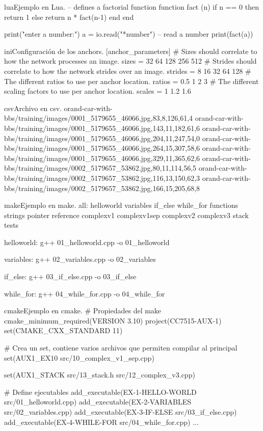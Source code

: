 \begin{sourcecode}{lua}{Ejemplo en Lua.}
-- defines a factorial function
function fact (n)
	if n == 0 then
		return 1
	else
		return n * fact(n-1)
	end
end

print("enter a number:")
a = io.read("*number")        -- read a number
print(fact(a))
\end{sourcecode}

\begin{sourcecode}{ini}{Configuración de los anchors.}
[anchor_parameters]
# Sizes should correlate to how the network processes an image.
sizes   = 32 64 128 256 512
# Strides should correlate to how the network strides over an image.
strides = 8 16 32 64 128
# The different ratios to use per anchor location.
ratios  = 0.5 1 2 3
# The different scaling factors to use per anchor location.
scales  = 1 1.2 1.6
\end{sourcecode}

\begin{sourcecode}{csv}{Archivo en csv.}
orand-car-with-bbs/training/images/0001_5179655_46066.jpg,83,8,126,61,4
orand-car-with-bbs/training/images/0001_5179655_46066.jpg,143,11,182,61,6
orand-car-with-bbs/training/images/0001_5179655_46066.jpg,204,11,247,54,0
orand-car-with-bbs/training/images/0001_5179655_46066.jpg,264,15,307,58,6
orand-car-with-bbs/training/images/0001_5179655_46066.jpg,329,11,365,62,6
orand-car-with-bbs/training/images/0002_5179657_53862.jpg,80,11,114,56,5
orand-car-with-bbs/training/images/0002_5179657_53862.jpg,116,13,150,62,3
orand-car-with-bbs/training/images/0002_5179657_53862.jpg,166,15,205,68,8
\end{sourcecode}

\begin{sourcecode}{make}{Ejemplo en make.}
all: helloworld variables if_else while_for functions strings pointer reference complexv1 complexv1sep complexv2 complexv3 stack tests

helloworld:
g++ 01_helloworld.cpp -o 01_helloworld

variables:
g++ 02_variables.cpp -o 02_variables

if_else:
g++ 03_if_else.cpp -o 03_if_else

while_for:
g++ 04_while_for.cpp -o 04_while_for
\end{sourcecode}

\begin{sourcecode}{cmake}{Ejemplo en cmake.}
# Propiedades del make
cmake_minimum_required(VERSION 3.10)
project(CC7515-AUX-1)
set(CMAKE_CXX_STANDARD 11)

# Crea un set, contiene varios archivos que permiten compilar al principal
set(AUX1_EX10
src/10_complex_v1_sep.cpp)

set(AUX1_STACK
src/13_stack.h
src/12_complex_v3.cpp)

# Define ejecutables
add_executable(EX-1-HELLO-WORLD src/01_helloworld.cpp)
add_executable(EX-2-VARIABLES src/02_variables.cpp)
add_executable(EX-3-IF-ELSE src/03_if_else.cpp)
add_executable(EX-4-WHILE-FOR src/04_while_for.cpp)
...
\end{sourcecode}

